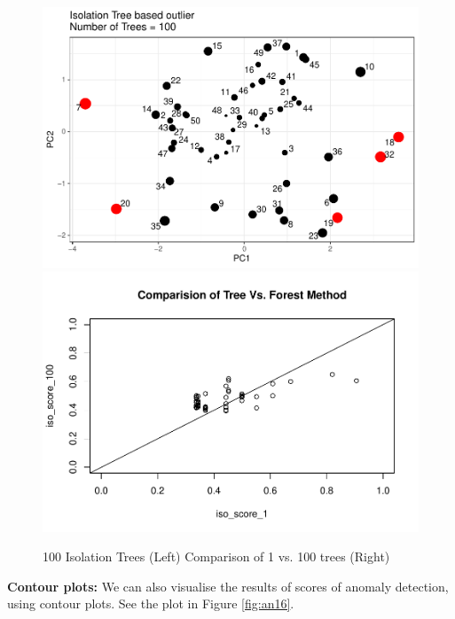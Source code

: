 \documentclass[
]{book}
\begin{document}
\begin{figure}

{\centering \includegraphics[width=0.48\linewidth]{DauR_files/figure-latex/an14-1} \includegraphics[width=0.48\linewidth]{DauR_files/figure-latex/an14-2} 

}

\caption{100 Isolation Trees (Left) Comparison of 1 vs. 100 trees (Right)}\label{fig:an14}
\end{figure}

\textbf{Contour plots:} We can also visualise the results of scores of anomaly detection, using contour plots. See the plot in Figure \ref{fig:an16}.
\end{document}
